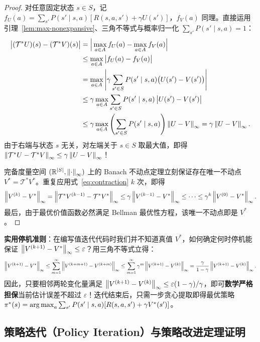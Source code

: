 \begin{proof}
对任意固定状态 $s \in S$，记 $f_U(a) = \sum_{s'} P(s'\mid s,a)[R(s,a,s') + \gamma U(s')]$，$f_V(a)$ 同理。直接运用引理~\ref{lem:max-nonexpansive}、三角不等式与概率归一化 $\sum_{s'} P(s'\mid s,a) = 1$：
\begin{align*}
  \big|(\mathcal{T}^* U)(s) - (\mathcal{T}^* V)(s)\big|
  &= \Big|\max_{a \in A} f_U(a) - \max_{a \in A} f_V(a)\Big| \\
  &\le \max_{a \in A} \big|f_U(a) - f_V(a)\big| \\
  &= \max_{a \in A} \left|\gamma \sum_{s' \in S} P(s' \mid s, a)\big(U(s') - V(s')\big)\right| \\
  &\le \gamma \max_{a \in A} \sum_{s' \in S} P(s' \mid s, a)\, \big|U(s') - V(s')\big| \\
  &\le \gamma \max_{a \in A} \left(\sum_{s' \in S} P(s' \mid s, a)\right) \left\|U - V\right\|_\infty
   = \gamma \left\|U - V\right\|_\infty.
\end{align*}
由于右端与状态 $s$ 无关，对左端关于 $s \in S$ 取最大值，即得 $\left\|\mathcal{T}^* U - \mathcal{T}^* V\right\|_\infty \le \gamma \left\|U - V\right\|_\infty$！

完备度量空间 $(\mathbb{R}^{|S|}, \left\|\cdot\right\|_\infty)$ 上的 Banach 不动点定理立刻保证存在唯一不动点 $V^* = \mathcal{T}^* V^*$。重复应用式~\eqref{eq:contraction} $k$ 次，即得
\[
  \left\|V^{(k)} - V^*\right\|_\infty = \left\|\mathcal{T}^* V^{(k-1)} - \mathcal{T}^* V^*\right\|_\infty
  \le \gamma \left\|V^{(k-1)} - V^*\right\|_\infty \le \cdots \le \gamma^k \left\|V^{(0)} - V^*\right\|_\infty.
\]
最后，由于最优价值函数必然满足 Bellman 最优性方程，该唯一不动点即是 $V^*$。
\end{proof}

\textbf{实用停机准则}：在编写值迭代代码时我们并不知道真值 $V^*$，如何确定何时停机能保证 $\left\|V^{(k+1)} - V^*\right\|_\infty \le \varepsilon$？用三角不等式立得：
\[
  \left\|V^{(k+1)} - V^*\right\|_\infty
  \le \sum_{m=1}^{\infty} \left\|V^{(k+m+1)} - V^{(k+m)}\right\|_\infty
  \le \sum_{m=1}^{\infty} \gamma^m \left\|V^{(k+1)} - V^{(k)}\right\|_\infty
  = \frac{\gamma}{1 - \gamma} \left\|V^{(k+1)} - V^{(k)}\right\|_\infty.
\]
因此，只要相邻两轮变化量满足 $\left\|V^{(k+1)} - V^{(k)}\right\|_\infty \le \varepsilon (1-\gamma)/\gamma$，即可\textbf{数学严格担保}当前估计误差不超过 $\varepsilon$！迭代结束后，只需一步贪心提取即得最优策略 $\pi^*(s) = \operatorname*{arg\,max}_a \sum_{s'} P(s'\mid s,a)[R(s,a,s') + \gamma V^*(s')]$。

\subsection{策略迭代（Policy Iteration）与策略改进定理证明}

